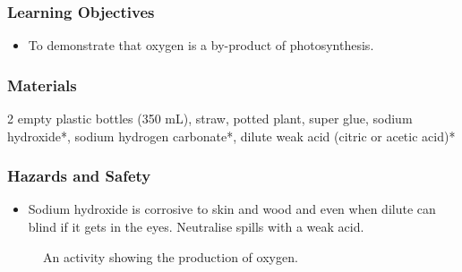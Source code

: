 \subsubsection*{Learning Objectives}
\begin{itemize}
\item{To demonstrate that oxygen is a by-product of photosynthesis.}
\end{itemize}

\subsubsection*{Materials}
2 empty plastic bottles (350 mL), straw, potted plant, super glue, sodium hydroxide*, sodium hydrogen carbonate*, dilute weak acid (citric or acetic acid)*

\subsubsection*{Hazards and Safety}
\begin{itemize}
\item{Sodium hydroxide is corrosive to skin and wood and even when dilute can blind if it gets in the eyes. Neutralise spills with a weak acid.}
\end{itemize}

\begin{figure}[h]
\begin{center}
\def\svgwidth{6cm}

\caption{An activity showing the production of oxygen.}
\label{fig:oxygen}
\end{center}
\end{figure}

